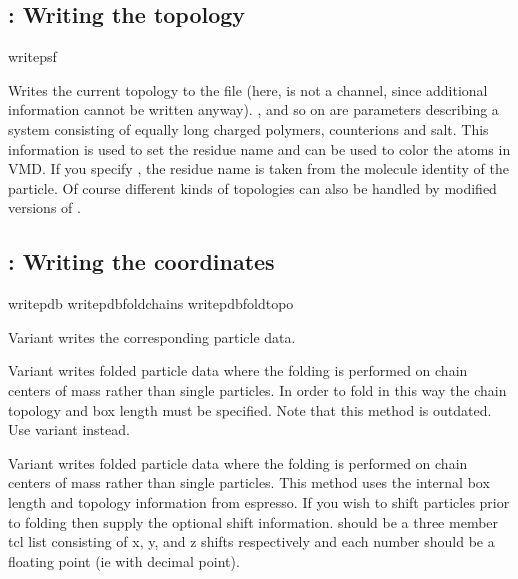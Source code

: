 \subsection{: Writing the topology}

\begin{essyntax}
  writepsf     
   
\end{essyntax}
Writes the current topology to the file  (here, 
is not a channel, since additional information cannot be written
anyway).  ,  and so on are parameters describing a
system consisting of equally long charged polymers, counterions and
salt.  This information is used to set the residue name and can be
used to color the atoms in VMD. If you specify , the
residue name is taken from the molecule identity of the particle. Of
course different kinds of topologies can also be handled by modified
versions of .


\subsection{: Writing the coordinates}

\begin{essyntax}
   writepdb 
   writepdbfoldchains  
    
   writepdbfoldtopo  
\end{essyntax}

Variant  writes the corresponding particle data. 

Variant  writes folded particle data where the folding is
performed on chain centers of mass rather than single particles. In
order to fold in this way the chain topology and box length must be
specified.  Note that this method is outdated. Use variant 
instead.

Variant  writes folded particle data where the folding is
performed on chain centers of mass rather than single particles. This
method uses the internal box length and topology information from
espresso. If you wish to shift particles prior to folding then supply
the optional shift information.  should be a three member
tcl list consisting of x, y, and z shifts respectively and each number
should be a floating point (ie with decimal point).

